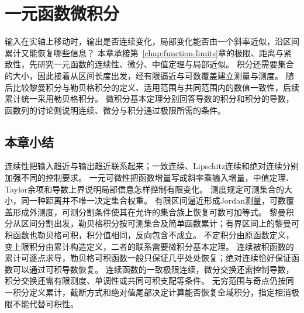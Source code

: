 \chapter{一元函数微积分}
\label{chap:univariate-calculus}
\label{chap:continuous-functions}
\label{chap:measurable-functions}

输入在实轴上移动时，输出是否连续变化，局部变化能否由一个斜率近似，沿区间累计又能恢复哪些信息？
本章承接第~\ref{chap:function-limits}章的极限、距离与紧致性，先研究一元函数的连续性、微分、中值定理与局部近似。
积分还需要集合的大小，因此接着从区间长度出发，经有限逼近与可数覆盖建立测量与测度。
随后比较黎曼积分与勒贝格积分的定义、适用范围与共同范围内的数值一致性，后续累计统一采用勒贝格积分。
微积分基本定理分别回答导数的积分和积分的导数，函数列的讨论则说明连续、微分与积分通过极限所需的条件。





\FloatBarrier
\section{本章小结}
\label{sec:analysis-summary}
\label{sec:measurable-summary}

连续性把输入趋近与输出趋近联系起来；一致连续、Lipschitz连续和绝对连续分别加强不同的控制要求。
一元可微性把函数增量写成斜率乘输入增量，中值定理、Taylor余项和导数上界说明局部信息怎样控制有限变化。
测度规定可测集合的大小，同一种距离并不唯一决定集合权重。
有限区间逼近形成Jordan测量，可数覆盖形成外测度，可测分割条件使其在允许的集合族上恢复可数可加等式。
黎曼积分从区间分割出发，勒贝格积分按可测集合及简单函数累计；有界区间上的黎曼可积函数也勒贝格可积，积分值相同，反向包含不成立。
不定积分由原函数定义，变上限积分由累计构造定义，二者的联系需要微积分基本定理。
连续被积函数的累计可逐点求导，勒贝格可积函数一般只保证几乎处处恢复；绝对连续恰好保证函数可以通过可积导数恢复。
连续函数的一致极限连续，微分交换还需控制导数，积分交换还需有限测度、单调性或共同可积支配等条件。
无穷范围与奇点仍按同一积分定义累计，截断方式和绝对值尾部决定计算能否恢复全域积分，指定相消极限不能代替可积性。
